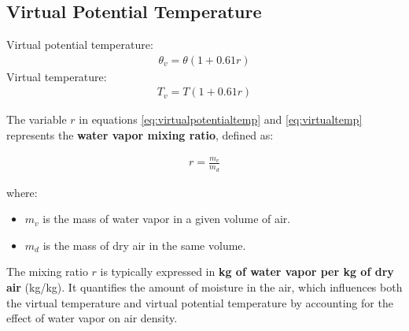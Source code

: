 \documentclass[fleqn,10pt]{SelfArx} %
\begin{document}
\subsection{Virtual Potential Temperature}
Virtual potential temperature:
\begin{align*}
	\theta_v = \theta(1+0.61r) \tag{2.2} \label{eq:virtualpotentialtemp}
\end{align*}
Virtual temperature:
\begin{align*}
	T_v = T(1+0.61r) \tag{2.3} \label{eq:virtualtemp}
\end{align*}

The variable \( r \) in equations \eqref{eq:virtualpotentialtemp} and \eqref{eq:virtualtemp} represents the \textbf{water vapor mixing ratio}, defined as:

\vspace{-0.8cm}
\begin{align*}
    r = \frac{m_v}{m_d}
\end{align*}
\vspace{-0.8cm}

where:\vspace{-0.5cm}
\begin{itemize}[noitemsep]
    \item \( m_v \) is the mass of water vapor in a given volume of air.
    \item \( m_d \) is the mass of dry air in the same volume.
\end{itemize}

The mixing ratio \( r \) is typically expressed in \textbf{kg of water vapor per kg of dry air} (kg/kg). It quantifies the amount of moisture in the air, which influences both the virtual temperature and virtual potential temperature by accounting for the effect of water vapor on air density.
\end{document}
